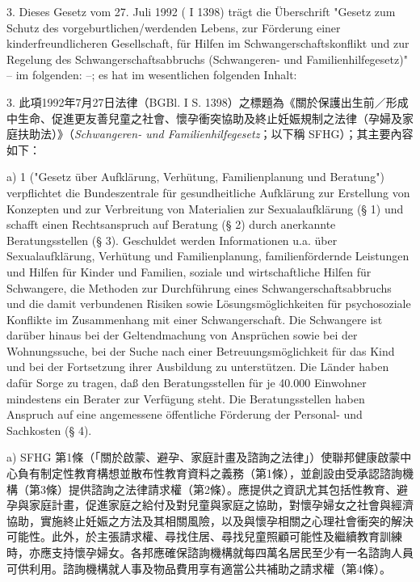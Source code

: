 \documentclass[12pt]{article}
\begin{document}
\begin{sourcepara}[title={原文理由 A.II.3.a}]
3. Dieses Gesetz vom 27. Juli 1992 (\abbrBGBl{} I \abbrS{} 1398) trägt die Überschrift "Gesetz zum Schutz des vorgeburtlichen/werdenden Lebens, zur Förderung einer kinderfreundlicheren Gesellschaft, für Hilfen im Schwangerschaftskonflikt und zur Regelung des Schwangerschaftsabbruchs (Schwangeren- und Familienhilfegesetz)" -- im folgenden: \abbrSFHG{} --; es hat im wesentlichen folgenden Inhalt:
\end{sourcepara}
\begin{transpara}
3. 此項1992年7月27日法律（BGBl. I S. 1398）之標題為《關於保護出生前／形成中生命、促進更友善兒童之社會、懷孕衝突協助及終止妊娠規制之法律（孕婦及家庭扶助法）》（\textit{Schwangeren- und Familienhilfegesetz}；以下稱 SFHG）；其主要內容如下：
\end{transpara}

\begin{sourcepara}[title={原文理由 A.II.3.a} Rn 48]
a) \abbrArt{} 1 \abbrSFHG{} ("Gesetz über Aufklärung, Verhütung, Familienplanung und Beratung") verpflichtet die Bundeszentrale für gesundheitliche Aufklärung zur Erstellung von Konzepten und zur Verbreitung von Materialien zur Sexualaufklärung (§ 1) und schafft einen Rechtsanspruch auf Beratung (§ 2) durch anerkannte Beratungsstellen (§ 3). Geschuldet werden Informationen u.a. über Sexualaufklärung, Verhütung und Familienplanung, familienfördernde Leistungen und Hilfen für Kinder und Familien, soziale und wirtschaftliche Hilfen für Schwangere, die Methoden zur Durchführung eines Schwangerschaftsabbruchs und die damit verbundenen Risiken sowie Lösungsmöglichkeiten für psychosoziale Konflikte im Zusammenhang mit einer Schwangerschaft. Die Schwangere ist darüber hinaus bei der Geltendmachung von Ansprüchen sowie bei der Wohnungssuche, bei der Suche nach einer Betreuungsmöglichkeit für das Kind und bei der Fortsetzung ihrer Ausbildung zu unterstützen. Die Länder haben dafür Sorge zu tragen, daß den Beratungsstellen für je 40.000 Einwohner mindestens ein Berater zur Verfügung steht. Die Beratungsstellen haben Anspruch auf eine angemessene öffentliche Förderung der Personal- und Sachkosten (§ 4).
\end{sourcepara}
\begin{transpara}
a) SFHG 第1條（「關於啟蒙、避孕、家庭計畫及諮詢之法律」）使聯邦健康啟蒙中心負有制定性教育構想並散布性教育資料之義務（第1條），並創設由受承認諮詢機構（第3條）提供諮詢之法律請求權（第2條）。應提供之資訊尤其包括性教育、避孕與家庭計畫，促進家庭之給付及對兒童與家庭之協助，對懷孕婦女之社會與經濟協助，實施終止妊娠之方法及其相關風險，以及與懷孕相關之心理社會衝突的解決可能性。此外，於主張請求權、尋找住居、尋找兒童照顧可能性及繼續教育訓練時，亦應支持懷孕婦女。各邦應確保諮詢機構就每四萬名居民至少有一名諮詢人員可供利用。諮詢機構就人事及物品費用享有適當公共補助之請求權（第4條）。
\end{transpara}
\end{document}
